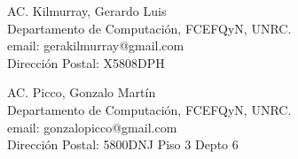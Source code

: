 \documentclass[%
 	final,
%
	notitlepage,
	narroweqnarray,
	inline,
 	twoside,
	]{ieee}
\begin{document}

\begin{biography}{AC. Kilmurray, Gerardo Luis}\\
Departamento de Computaci\'on, FCEFQyN, UNRC.\\
email: gerakilmurray@gmail.com\\
Direcci\'on Postal: X5808DPH
\end{biography}


\begin{biography}{AC. Picco, Gonzalo Mart\'in}\\
Departamento de Computaci\'on, FCEFQyN, UNRC.\\
email: gonzalopicco@gmail.com\\
Direcci\'on Postal: 5800DNJ Piso 3 Depto 6
\end{biography}
\end{document}
